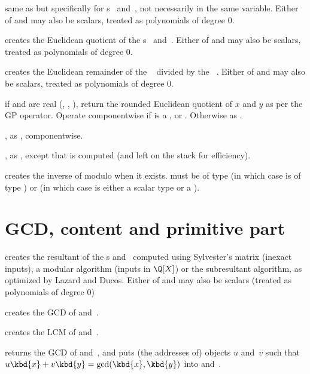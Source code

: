  same as  but
specifically for s~ and~, not necessarily in the same
variable. Either of  and  may also be scalars, treated as
polynomials of degree $0$.

 creates the Euclidean quotient of the
s~ and~. Either of  and  may also be
scalars, treated as polynomials of degree $0$.

 creates the Euclidean remainder of the
~ divided by the ~. Either of  and
 may also be scalars, treated as polynomials of degree $0$.


 if  and  are real
(, , ), return the rounded Euclidean quotient of
$x$ and $y$ as per the \kbd{\bs/} GP operator. Operate componentwise if
 is a ,  or . Otherwise as .

, as ,
componentwise.

, as , except that
 is computed (and left on the stack for efficiency).

 creates the inverse of  modulo 
when it exists.  must be of type  (in which case  is
of type ) or  (in which case  is either a scalar
type or a ).

\section{GCD, content and primitive part}


 creates the resultant of the s
 and~ computed using Sylvester's matrix (inexact inputs), a
modular algorithm (inputs in $\Q[X]$) or the subresultant algorithm, as
optimized by Lazard and Ducos. Either of  and  may also be
scalars (treated as polynomials of degree $0$)

 creates the GCD of  and~.

 creates the LCM of  and~.

 returns the GCD of 
and~, and puts (the addresses of) objects $u$ and~$v$ such that
$u\kbd{x}+v\kbd{y}=\gcd(\kbd{x},\kbd{y})$ into  and~.


